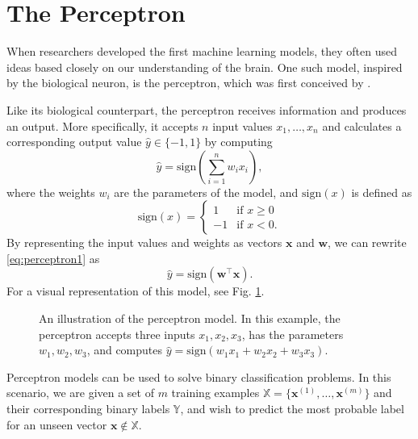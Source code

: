 \section{The Perceptron}
\label{sec:perceptron}
When researchers developed the first machine learning models, they often used ideas based closely on our understanding of the brain. One such model, inspired by the biological neuron, is the perceptron, which was first conceived by \cite{McCulloch1943115}.

Like its biological counterpart, the perceptron receives information and produces an output. More specifically, it accepts $n$ input values $x_1, \ldots, x_n$ and calculates a corresponding output value $\hat{y} \in \{-1, 1\}$ by computing
\begin{equation}\label{eq:perceptron1}
	\hat{y} = \text{sign}\left (\sum_{i=1}^{n} w_ix_i\right ),
\end{equation}
where the weights $w_i$ are the parameters of the model, and $\text{sign}(x)$ is defined as
\begin{equation}
\text{sign}(x) = \begin{cases} 1 & \text{if }x \geq 0
							\\-1 & \text{if }x < 0.
\end{cases}
\end{equation}
By representing the input values and weights as vectors $\bm{x}$ and $\bm{w}$, we can rewrite \eqref{eq:perceptron1} as
\begin{equation}
\hat{y} = \text{sign}(\bm{w}^\top\bm{x}).
\end{equation}
For a visual representation of this model, see Fig. \ref{fig:perceptron}. 

\begin{figure}
	\begin{center}
		
	\end{center}
	\caption{An illustration of the perceptron model. In this example, the perceptron accepts three inputs $x_1, x_2, x_3$, has the parameters $w_1, w_2, w_3$, and computes $\hat{y} = \text{sign}(w_1x_1 + w_2x_2 + w_3x_3).$}
	\label{fig:perceptron}
\end{figure}

Perceptron models can be used to solve binary classification problems. In this scenario, we are given a set of $m$ training examples $\mathbb{X} = \{\bm{x}^{(1)}, \ldots, \bm{x}^{(m)}\}$ and their corresponding binary labels $\mathbb{Y}$, and wish to predict the most probable label for an unseen vector $\bm{x} \notin \mathbb{X}$.

